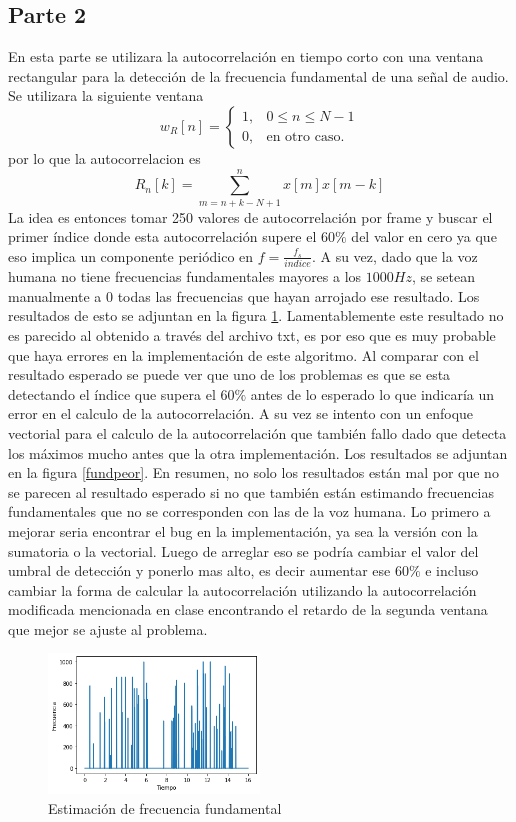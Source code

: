 \documentclass[a4paper]{article}
\begin{document}
\subsection{Parte 2}
En esta parte se utilizara la autocorrelación en tiempo corto con una ventana rectangular para la detección de la frecuencia fundamental de una señal de audio. Se utilizara la siguiente ventana
$$
w_R[n]=
			\begin{cases}
				1, & 0 \leq n \leq N-1 \\
				0, & \text{en otro caso}.
			\end{cases}
$$
por lo que la autocorrelacion es 
$$
R_n[k] = \sum_{m=n+k-N+1}^{n} x[m]x[m-k]
$$
La idea es entonces tomar 250 valores de autocorrelación por frame y buscar el primer índice donde esta autocorrelación supere el $60\%$ del valor en cero ya que eso implica un componente periódico en $f = \frac{f_s}{indice}$. A su vez, dado que la voz humana no tiene frecuencias fundamentales mayores a los $1000Hz$, se setean manualmente a 0 todas las frecuencias que hayan arrojado ese resultado. Los resultados de esto se adjuntan en la figura \ref{fund}. Lamentablemente este resultado no es parecido al obtenido a través del archivo txt, es por eso que es muy probable que haya errores en la implementación de este algoritmo. Al comparar con el resultado esperado se puede ver que uno de los problemas es que se esta detectando el índice que supera el $60\%$ antes de lo esperado lo que indicaría un error en el calculo de la autocorrelación. A su vez se intento con un enfoque vectorial para el calculo de la autocorrelación que también fallo dado que detecta los máximos mucho antes que la otra implementación. Los resultados se adjuntan en la figura \ref{fundpeor}. 
En resumen, no solo los resultados están mal por que no se parecen al resultado esperado si no que también están estimando frecuencias fundamentales que no se corresponden con las de la voz humana. 
Lo primero a mejorar seria encontrar el bug en la implementación, ya sea la versión con la sumatoria o la vectorial. Luego de arreglar eso se podría cambiar el valor del umbral de detección y ponerlo mas alto, es decir aumentar ese $60\%$ e incluso cambiar la forma de calcular la autocorrelación utilizando la autocorrelación modificada mencionada en clase encontrando el retardo de la segunda ventana que mejor se ajuste al problema. 

\begin{figure}[h]
\centering
\includegraphics[width=0.5\textwidth]{fundamental.png}
\caption{Estimación de frecuencia fundamental}
\label{fund}
\end{figure}
\end{document}
